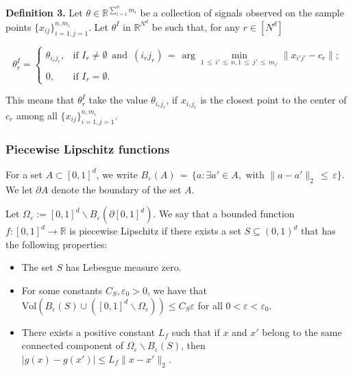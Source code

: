 \documentclass[twoside,11pt]{article}
\begin{document}
\textbf{Definition 3.} Let \(\theta \in \mathbb{R}^{\sum_{i=1}^n m_i}\) be a collection of signals observed on the sample points \(\{x_{ij}\}^{n,m_i}_{i=1,j=1}\). Let \(\theta^I\) in \(\mathbb{R}^{N^d}\) be such that, for any \(r \in [N^d]\)

\[
\theta^I_r = 
\begin{cases} 
\theta_{i_rj_r}, & \text{if } I_r \neq \emptyset \,\,\,\text{and}\,\,\, (i_rj_r) \,=\, \arg\min_{1 \,\leq\, i' \,\leq\, n, 1 \,\leq\, j' \,\leq\, m_{i'}}\|x_{i'j'} - c_r\|; \\
0, & \text{if } I_r = \emptyset.
\end{cases}
\]

This means that \(\theta^I_r\) take the value \(\theta_{i_rj_r}\), if \(x_{i_rj_r}\) is the closest point to the center of \(c_r\) among all \(\{x_{ij}\}^{n,m_i}_{i=1,j=1}\).

\subsubsection{Piecewise Lipschitz functions}
\label{plf_notation}

\begin{definition}
\label{def_S}
    For a set \( A \subset [0,1]^d \), we write \( B_{\varepsilon}(A) \,=\, \{a : \exists a' \in A, \text{ with } \|a - a'\|_2 \,\leq\, \varepsilon\} \). We let \( \partial A \) denote the boundary of the set \( A \).

Let \( \Omega_{\varepsilon} := [0,1]^d \backslash B_{\varepsilon}(\partial[0,1]^d) \). We say that a bounded function \( f : [0,1]^d \rightarrow \mathbb{R} \) is piecewise Lipschitz if there exists a set \( S \subseteq (0,1)^d \) that has the following properties:

\begin{itemize}
  \item The set \( S \) has Lebesgue measure zero.
  \item For some constants \( C_S, \varepsilon_0 > 0 \), we have that \( \text{Vol} (B_{\varepsilon}(S) \cup ([0,1]^d \backslash \Omega_{\varepsilon})) \leq  C_S\varepsilon \) for all \( 0 < \varepsilon < \varepsilon_0 \).
  \item There exists a positive constant \( L_f \) such that if \( x \) and \( x' \) belong to the same connected component of \( \Omega_{\varepsilon} \backslash B_{\varepsilon}(S) \), then \( |g(x) - g(x')| \leq  L_f \|x - x'\|_2 \).
\end{itemize}

\end{definition}
\end{document}

